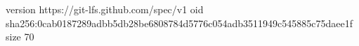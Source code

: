version https://git-lfs.github.com/spec/v1
oid sha256:0cab0187289adbb5db28be6808784d5776c054adb3511949c545885c75daee1f
size 70
